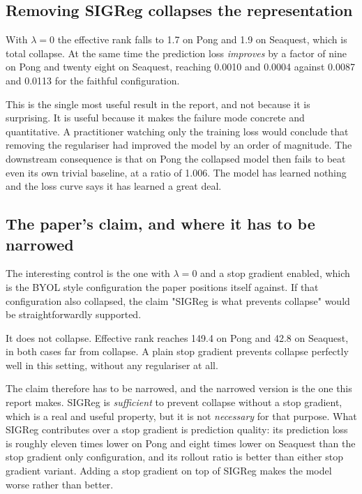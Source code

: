 \documentclass[11pt,a4paper]{article}
\begin{document}
\subsection{Removing SIGReg collapses the representation}

With $\lambda = 0$ the effective rank falls to 1.7 on Pong and 1.9 on Seaquest,
which is total collapse. At the same time the prediction loss \emph{improves} by a
factor of nine on Pong and twenty eight on Seaquest, reaching 0.0010 and 0.0004
against 0.0087 and 0.0113 for the faithful configuration.

This is the single most useful result in the report, and not because it is
surprising. It is useful because it makes the failure mode concrete and
quantitative. A practitioner watching only the training loss would conclude that
removing the regulariser had improved the model by an order of magnitude. The
downstream consequence is that on Pong the collapsed model then fails to beat even
its own trivial baseline, at a ratio of 1.006. The model has learned nothing and
the loss curve says it has learned a great deal.

\subsection{The paper's claim, and where it has to be narrowed}

The interesting control is the one with $\lambda = 0$ and a stop gradient enabled,
which is the BYOL style configuration the paper positions itself against. If that
configuration also collapsed, the claim "SIGReg is what prevents collapse" would be
straightforwardly supported.

It does not collapse. Effective rank reaches 149.4 on Pong and 42.8 on Seaquest, in
both cases far from collapse. A plain stop gradient prevents collapse perfectly
well in this setting, without any regulariser at all.

The claim therefore has to be narrowed, and the narrowed version is the one this
report makes. SIGReg is \emph{sufficient} to prevent collapse without a stop
gradient, which is a real and useful property, but it is not \emph{necessary} for
that purpose. What SIGReg contributes over a stop gradient is prediction quality:
its prediction loss is roughly eleven times lower on Pong and eight times lower on
Seaquest than the stop gradient only configuration, and its rollout ratio is better
than either stop gradient variant. Adding a stop gradient on top of SIGReg makes
the model worse rather than better.
\end{document}
